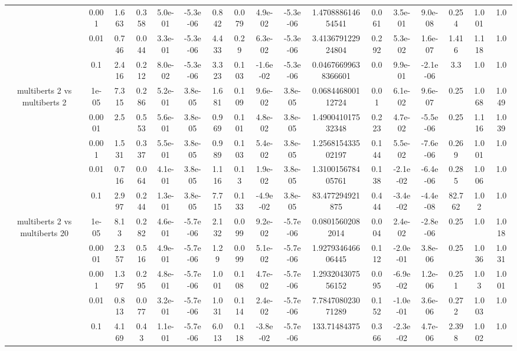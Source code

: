 \begin{tabular}{|c|c|c|c|c|c|c|c|c|c|c|c|c|c|c|c|c|}
 & 0.001 & 1.663 & 0.358 & 5.0e-01 & -5.3e-06 & 0.842 & 0.079 & 4.9e-02 & -5.3e-06 & 1.470888614654541 & 0.061 & 3.5e-01 & 9.0e-08 & 0.254 & 1.001 & 1.0 \\
 & 0.01 & 0.746 & 0.044 & 3.3e-01 & -5.3e-06 & 4.433 & 0.29 & 6.3e-02 & -5.3e-06 & 3.413679122924804 & 0.292 & 5.3e-02 & 1.6e-07 & 1.416 & 1.118 & 1.0 \\
 & 0.1 & 2.416 & 0.212 & 8.0e-02 & -5.3e-06 & 3.323 & 0.103 & -1.6e-02 & -5.3e-06 & 0.04676699638366601 & 0.0 & 9.9e-01 & -2.1e-06 & 3.3 & 1.0 & 1.0 \\
\hline
\multirow{5}{*}{multiberts 2 vs multiberts 2} & 1e-05 & 7.315 & 0.286 & 5.2e-01 & 3.8e-05 & 1.681 & 0.109 & 9.6e-02 & 3.8e-05 & 0.068446800112724 & 0.01 & 6.1e-02 & 9.6e-07 & 0.25 & 1.068 & 1.049 \\
 & 0.0001 & 2.5 & 0.553 & 5.6e-01 & 3.8e-05 & 0.969 & 0.101 & 4.8e-02 & 3.8e-05 & 1.490041017532348 & 0.223 & 4.7e-02 & -5.5e-06 & 0.25 & 1.116 & 1.039 \\
 & 0.001 & 1.531 & 0.337 & 5.5e-01 & 3.8e-05 & 0.989 & 0.103 & 5.4e-02 & 3.8e-05 & 1.256815433502197 & 0.144 & 5.5e-02 & -7.6e-06 & 0.269 & 1.001 & 1.0 \\
 & 0.01 & 0.716 & 0.064 & 4.1e-01 & 3.8e-05 & 1.116 & 0.13 & 1.9e-02 & 3.8e-05 & 1.310015678405761 & 0.138 & -2.1e-02 & -6.4e-06 & 0.285 & 1.006 & 1.0 \\
 & 0.1 & 2.997 & 0.244 & 1.3e-01 & 3.8e-05 & 7.715 & 0.133 & -4.9e-02 & 3.8e-05 & 83.477294921875 & 0.444 & -3.4e-02 & -4.4e-08 & 82.762 & 1.02 & 1.0 \\
\hline
\multirow{5}{*}{multiberts 2 vs multiberts 20} & 1e-05 & 8.13 & 0.282 & 4.6e-01 & -5.7e-06 & 2.132 & 0.099 & 9.2e-02 & -5.7e-06 & 0.08015602082014 & 0.004 & 2.4e-02 & -2.8e-06 & 0.25 & 1.0 & 1.018 \\
 & 0.0001 & 2.357 & 0.516 & 4.9e-01 & -5.7e-06 & 1.29 & 0.099 & 5.1e-02 & -5.7e-06 & 1.927934646606445 & 0.112 & -2.0e-01 & 3.8e-06 & 0.25 & 1.036 & 1.031 \\
 & 0.001 & 1.397 & 0.295 & 4.8e-01 & -5.7e-06 & 1.001 & 0.108 & 4.7e-02 & -5.7e-06 & 1.293204307556152 & 0.095 & -6.9e-02 & 1.2e-06 & 0.251 & 1.03 & 1.001 \\
 & 0.01 & 0.813 & 0.077 & 3.2e-01 & -5.7e-06 & 1.031 & 0.114 & 2.4e-02 & -5.7e-06 & 7.784708023071289 & 0.152 & -1.0e-01 & 3.6e-06 & 0.272 & 1.003 & 1.0 \\
 & 0.1 & 4.169 & 0.43 & 1.1e-01 & -5.7e-06 & 6.013 & 0.118 & -3.8e-02 & -5.7e-06 & 133.71484375 & 0.366 & -2.3e-02 & 4.7e-06 & 2.398 & 1.002 & 1.0 \\

\end{tabular}
